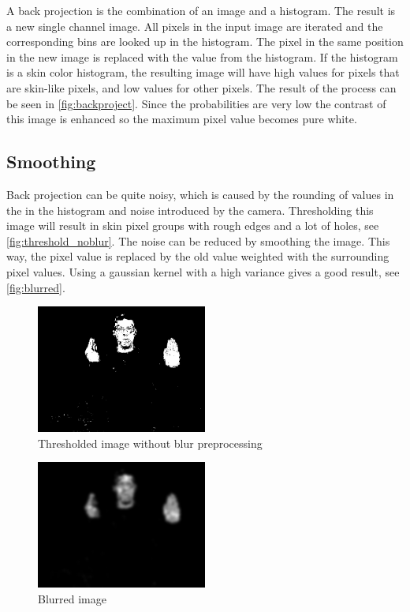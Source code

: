 A back projection is the combination of an image and a histogram. The result is a new single channel image. All pixels in the input image are iterated and the corresponding bins are looked up in the histogram. The pixel in the same position in the new image is replaced with the value from the histogram. If the histogram is a skin color histogram, the resulting image will have high values for pixels that are skin-like pixels, and low values for other pixels. The result of the process can be seen in \autoref{fig:backproject}. Since the probabilities are very low the contrast of this image is enhanced so the maximum pixel value becomes pure white.


\subsection*{Smoothing}
Back projection can be quite noisy, which is caused by the rounding of values in the in the histogram and noise introduced by the camera. Thresholding this image will result in skin pixel groups with rough edges and a lot of holes, see \autoref{fig:threshold_noblur}. The noise can be reduced by smoothing the image. This way, the pixel value is replaced by the old value weighted with the surrounding pixel values. Using a gaussian kernel with a high variance gives a good result, see \autoref{fig:blurred}.

\begin{figure}[tb]
    \center{}
 \includegraphics[width=0.5\textwidth]{figures/pipeline/thresholded_noblur.jpg}
	\caption{Thresholded image without blur preprocessing}
	\label{fig:threshold_noblur}
\end{figure}

\begin{figure}[tb]
    \center{}
    \includegraphics[width=0.5\textwidth]{figures/pipeline/blurred.jpg}
	\caption{Blurred image}
	\label{fig:blurred}
\end{figure}


